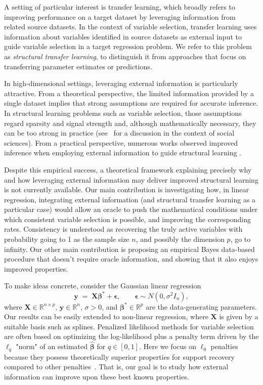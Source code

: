 \documentclass[
  12pt]{article}
\newcommand{\R}{\mathbb{R}}
\newcommand{\by}{\mathbf{y}}
\newcommand{\bbeta}{\boldsymbol{\beta}}
\newcommand{\bepsilon}{\mathbf{\epsilon}}
\newcommand{\bX}{\mathbf{X}}
\begin{document}
A setting of particular interest is transfer learning, which broadly refers to improving performance on a target dataset by leveraging information from related source datasets.
In the context of variable selection, transfer learning uses information about variables identified in source datasets as external input to guide variable selection in a target regression problem.
We refer to this problem as \emph{structural transfer learning}, to distinguish it from approaches that focus on transferring parameter estimates or predictions.

In high-dimensional settings, leveraging external information is particularly attractive.
From a theoretical perspective, the limited information provided by a single dataset implies that strong assumptions are required for accurate inference. In structural learning problems such as variable selection, those assumptions regard sparsity and signal strength and, although mathematically necessary, they can be too strong in practice 
(see~\cite{giannone2021economic} for a discussion in the context of social sciences). From a practical perspective, numerous works observed improved inference when employing external information to guide structural learning \citep{stingo:2011, Boulesteix2017, chen_tinghuei:2021}. 

Despite this empirical success, a theoretical framework explaining precisely why and how leveraging external information may deliver improved structural learning is not currently available. 
Our main contribution is investigating how, in linear regression, integrating external information (and structural transfer learning as a particular case) would allow an oracle to push the mathematical conditions under which consistent variable selection is possible, and improving the corresponding rates. Consistency is understood as recovering the truly active variables with probability going to 1 as the sample size $n$, and possibly the dimension $p$, go to infinity. 
Our other main contribution is proposing an empirical Bayes data-based procedure that doesn't require oracle information, and showing that it also enjoys improved properties.

To make ideas concrete, consider the Gaussian linear regression
\begin{equation}\label{eq:linearmodel}
	\by \;=\; \bX \bbeta^* + \bepsilon,\qquad \bepsilon \sim N(0,\sigma^2 I_n),
\end{equation}
where $\bX\in \R^{n\times p}$, $\by\in \R^n$, $\sigma >0$, and $\bbeta^* \in \mathbb{R}^p$ are the data-generating parameters. Our results can be easily  extended to non-linear regression, where $\bX$ is given by a suitable basis such as splines. 
Penalized likelihood methods for variable selection are often based on optimizing the log-likelihood plus a penalty term driven by the $\ell_q$ "norm" of an estimated $\hat{\bbeta}$ for $q\in [0,1]$. 
Here we focus on $\ell_0$ penalties because they possess theoretically superior properties for support recovery compared to other penalties~\citep{infotheowainwright, gao2025optimalityl0}. That is, our goal is to study how external information can improve upon these best known properties. 
\end{document}
